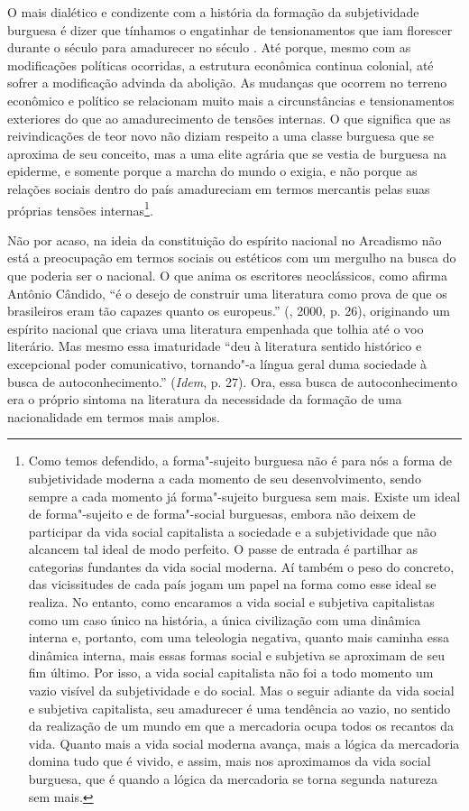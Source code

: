 O mais dialético e condizente com a história da formação da
subjetividade burguesa é dizer que tínhamos o engatinhar de
tensionamentos que iam florescer durante o século  para amadurecer no
século . Até porque, mesmo com as modificações políticas ocorridas, a
estrutura econômica continua colonial, até sofrer a modificação advinda
da abolição. As mudanças que ocorrem no terreno econômico e político se
relacionam muito mais a circunstâncias e tensionamentos exteriores do
que ao amadurecimento de tensões internas. O que significa que as
reivindicações de teor novo não diziam respeito a uma classe burguesa
que se aproxima de seu conceito, mas a uma elite agrária que se vestia
de burguesa na epiderme, e somente porque a marcha do mundo o exigia, e
não porque as relações sociais dentro do país amadureciam em termos
mercantis pelas suas próprias tensões internas\footnote{Como temos
  defendido, a forma"-sujeito burguesa não é para nós a forma de
  subjetividade moderna a cada momento de seu desenvolvimento, sendo
  sempre a cada momento já forma"-sujeito burguesa sem mais. Existe um
  ideal de forma"-sujeito e de forma"-social burguesas, embora não deixem
  de participar da vida social capitalista a sociedade e a subjetividade
  que não alcancem tal ideal de modo perfeito. O passe de entrada é
  partilhar as categorias fundantes da vida social moderna. Aí também o
  peso do concreto, das vicissitudes de cada país jogam um papel na
  forma como esse ideal se realiza. No entanto, como encaramos a vida
  social e subjetiva capitalistas como um caso único na história, a
  única civilização com uma dinâmica interna e, portanto, com
  uma teleologia negativa, quanto mais caminha essa dinâmica interna,
  mais essas formas social e subjetiva se aproximam de seu fim último.
  Por isso, a vida social capitalista não foi a todo momento um vazio
  visível da subjetividade e do social. Mas o seguir adiante da vida
  social e subjetiva capitalista, seu amadurecer é uma tendência ao
  vazio, no sentido da realização de um mundo em que a mercadoria ocupa
  todos os recantos da vida. Quanto mais a vida social moderna avança,
  mais a lógica da mercadoria domina tudo que é vivido, e assim, mais
  nos aproximamos da vida social burguesa, que é quando a lógica da
  mercadoria se torna segunda natureza sem mais.}.

Não por acaso, na ideia da constituição do espírito nacional no
Arcadismo não está a preocupação em termos sociais ou estéticos com um
mergulho na busca do que poderia ser o nacional. O que anima os
escritores neoclássicos, como afirma Antônio Cândido, ``é o desejo de
construir uma literatura como prova de que os brasileiros eram tão
capazes quanto os europeus.'' (, 2000, p. 26), originando um
espírito nacional que criava uma literatura empenhada que tolhia até o
voo literário. Mas mesmo essa imaturidade ``deu à literatura sentido
histórico e excepcional poder comunicativo, tornando"-a língua geral duma
sociedade à busca de autoconhecimento.'' (\emph{Idem}, p. 27). Ora, essa
busca de autoconhecimento era o próprio sintoma na literatura da
necessidade da formação de uma nacionalidade em termos mais amplos.

